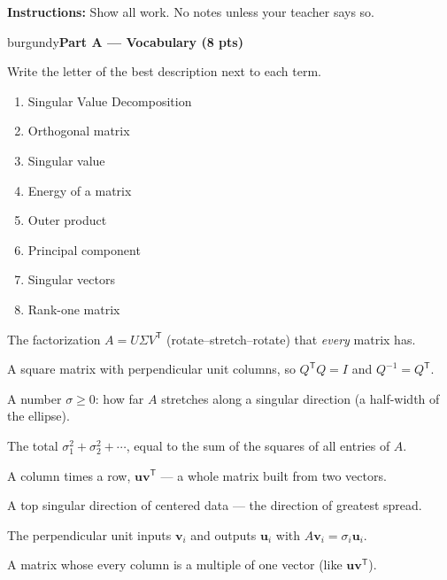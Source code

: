 \documentclass[10pt]{article}
\newcommand{\vv}{\mathbf{v}}
\newcommand{\uu}{\mathbf{u}}
\newcommand{\T}{^{\mathsf T}}
\newcommand{\parthead}[1]{%
  \vspace{6pt}\noindent
  \begin{headlinebox}{burgundy}{\color{white}\bfseries #1}\end{headlinebox}%
  \vspace{4pt}}
\begin{document}
\namedateperiod

\vspace{0.06in}
\noindent\textbf{Instructions:} Show all work. No notes unless your teacher says so.

\parthead{Part A --- Vocabulary (8 pts)}
Write the letter of the best description next to each term.

\vspace{4pt}
\noindent
\begin{minipage}[t]{0.40\textwidth}
\begin{enumerate}[leftmargin=2.2em, itemsep=7pt, label=\arabic*.]
  \item Singular Value Decomposition 
  \item Orthogonal matrix 
  \item Singular value 
  \item Energy of a matrix 
  \item Outer product 
  \item Principal component 
  \item Singular vectors 
  \item Rank-one matrix 
\end{enumerate}
\end{minipage}%
\hfill
\begin{minipage}[t]{0.57\textwidth}
\small
\begin{description}[leftmargin=1.4em, itemsep=3pt]
  \item[(A)] The factorization $A=U\Sigma V\T$ (rotate--stretch--rotate) that \emph{every} matrix has.
  \item[(B)] A square matrix with perpendicular unit columns, so $Q\T Q=I$ and $Q^{-1}=Q\T$.
  \item[(C)] A number $\sigma\ge0$: how far $A$ stretches along a singular direction (a half-width of the ellipse).
  \item[(D)] The total $\sigma_1^2+\sigma_2^2+\cdots$, equal to the sum of the squares of all entries of $A$.
  \item[(E)] A column times a row, $\uu\vv\T$ --- a whole matrix built from two vectors.
  \item[(F)] A top singular direction of centered data --- the direction of greatest spread.
  \item[(G)] The perpendicular unit inputs $\vv_i$ and outputs $\uu_i$ with $A\vv_i=\sigma_i\uu_i$.
  \item[(H)] A matrix whose every column is a multiple of one vector (like $\uu\vv\T$).
\end{description}
\end{minipage}
\end{document}

